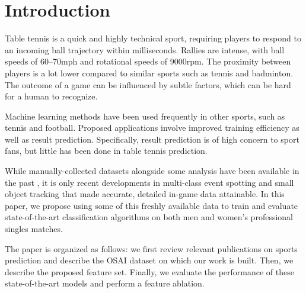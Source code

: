 \section{Introduction}
Table tennis is a quick and highly technical sport, requiring players to respond to an incoming ball trajectory within milliseconds. Rallies are intense, with ball speeds of 60--70mph and rotational speeds of 9000rpm. The proximity between players is  a lot lower compared to similar sports such as tennis and badminton. The  outcome of a game can be influenced by subtle factors, which can be hard for a human to recognize.

Machine learning methods have been used frequently  in other sports, such as tennis and football. Proposed applications involve improved training efficiency 
as well as result prediction. Specifically, result prediction is of high concern to sport fans, but little has been done in table tennis prediction.


While manually-collected datasets alongside some analysis have been available in the past \cite{wang2019tac}, it is only recent developments in  multi-class event spotting and small object tracking that made accurate, detailed in-game data attainable.
In this paper, we propose using some of this freshly available data to train and evaluate  state-of-the-art classification algorithms on both men and women's professional singles matches. %



The paper is organized as follows: we first review relevant publications on sports prediction and describe the OSAI dataset on which our work is built. Then, we describe the proposed feature set. Finally, we evaluate the performance of these state-of-the-art models and perform a feature ablation.